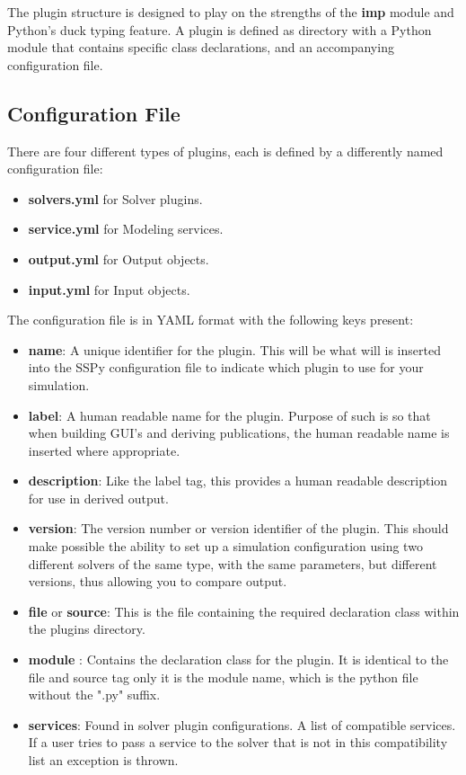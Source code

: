 \documentclass[12pt]{article}
\begin{document}
The plugin structure is designed to play on the strengths of the {\bf imp} module and Python's duck typing feature. A plugin is defined as directory with a Python module that contains specific class declarations, and an accompanying configuration file. 

\subsection*{Configuration File}

There are four different types of plugins, each is defined by a differently named configuration file:

\begin{itemize}
	\item[] {\bf solvers.yml} for Solver plugins.
	\item[] {\bf service.yml} for Modeling services.
	\item[] {\bf output.yml} for Output objects.
	\item[] {\bf input.yml} for Input objects.
\end{itemize}

The configuration file is in YAML format with the following keys present:

\begin{itemize}
	\item[] {\bf name}: A unique identifier for the plugin. This will be what will is inserted into the SSPy configuration file to indicate which plugin to use for your simulation.
	\item[] {\bf label}: A human readable name for the plugin. Purpose of such is so that when building GUI's and deriving publications, the human readable name is inserted where appropriate. 
	\item[] {\bf description}: Like the label tag, this provides a human readable description for use in derived output.
	\item[] {\bf version}: The version number or version identifier of the plugin. This should make possible the ability to set up a simulation configuration using two different solvers of the same type, with the same parameters, but different versions, thus allowing you to compare output.
	\item[] {\bf file} or {\bf source}: This is the file containing the required declaration class within the plugins directory. 
	\item[] {\bf module} : Contains the declaration class for the plugin. It is identical to the file and source tag only it is the module name, which is the python file without the ".py" suffix.
	\item[]{\bf services}: Found in solver plugin configurations. A list of compatible services. If a user tries to pass a service to the solver that is not in this compatibility list an exception is thrown. 
\end{itemize}
\end{document}
